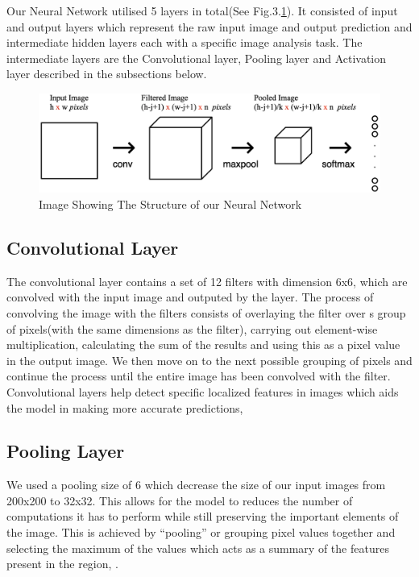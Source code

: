 \documentclass[conference]{IEEEtran}
\begin{document}

\indent Our Neural Network utilised 5 layers in total(See Fig.3.\ref{fig:CNN_layers}\cite{CNN_layers}). It consisted of input and output layers which represent the raw input image and output prediction and intermediate hidden layers each with a specific image analysis task. The intermediate layers are the Convolutional layer, Pooling layer and Activation layer described in the subsections below.\\

\begin{figure}[ht!]
  \centering
  \includegraphics[scale=0.2]{images/CNN_layers.png}
  \caption{Image Showing The Structure of our Neural Network}
  \label{fig:CNN_layers}

\end{figure}

\subsection{Convolutional Layer}
The convolutional layer contains a set of 12 filters with dimension 6x6,  which are convolved with the input image and outputed by the layer. The process of convolving the image with the filters consists of overlaying the filter over s group of pixels(with the same dimensions as the filter), carrying out element-wise multiplication, calculating the sum of the results and using this as a pixel value in the output image. We then move on to the next possible grouping of pixels and continue the process until the entire image has been convolved with the filter. Convolutional layers help detect specific localized features in images which aids the model in making more accurate predictions, \cite{CNNPart1_VZ_2019}
\subsection{Pooling Layer}
We used a pooling size of 6 which decrease the size of  our input images from 200x200 to 32x32. This allows for the model to reduces the number of computations it has to perform while still preserving the important elements of the image. This is achieved by “pooling” or grouping pixel values together and selecting the maximum of the values which acts as a summary of the features present in the region, \cite{CNNPart1_VZ_2019}.
\end{document}
